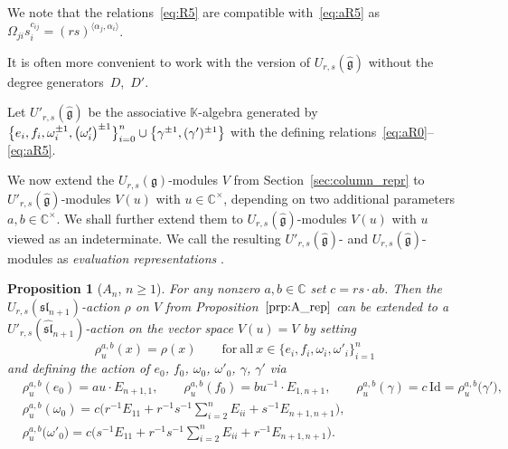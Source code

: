 \documentclass[10pt,a4paper]{amsart}
\numberwithin{equation}{section}
\newtheorem{Proposition}[Theorem]{Proposition}
 { \theoremstyle{definition}
\newtheorem{Definition}[Theorem]{Definition}
\newtheorem{Note}[Theorem]{Note}
\newtheorem{Example}[Theorem]{Example}
\newtheorem{Remark}[Theorem]{Remark} }
\newcommand{\fg}{\mathfrak{g}}
\newcommand{\BC}{\mathbb{C}}
\newcommand{\ssl}{\mathfrak{sl}}
\newcommand{\uu}{U_{r,s}(\fg)}
\newcommand{\UU}{U_{r,s}(\widehat{\fg})}
\newcommand{\Uu}{U'_{r,s}(\widehat{\fg})}
\newcommand{\Id}{\mathrm{Id}}
\begin{document}
 \begin{Remark}
We note that the relations~\eqref{eq:R5} are compatible with~\eqref{eq:aR5} as $\Omega_{ji}s_i^{c_{ij}}=(rs)^{\langle \alpha_j,\alpha_i\rangle}$.
\end{Remark}

It is often more convenient to work with the version of $\UU$ without the degree generators~$D$,~$D'$.

\begin{Definition}%
Let $\Uu$ be the associative $\mathbb{K}$-algebra generated by
$\smash{\bigl\{e_{i},f_{i},\omega_{i}^{\pm 1},\bigl(\omega_{i}'\bigr)^{\pm 1}\bigr\}_{i=0}^{n}}\cup \smash{\bigl\{\gamma^{\pm 1},(\gamma')^{\pm 1}\bigr\}}$
with the defining relations~\eqref{eq:aR0}--\eqref{eq:aR5}.
\end{Definition}

We now extend the $\uu$-modules $V$ from Section~\ref{sec:column_repr} to $\Uu$-modules $V(u)$ with $u\in\BC^\times$, depending on two additional parameters $a,b\in \BC^\times$. We shall further extend them to $\UU$-modules $V(u)$ with $u$ viewed as an indeterminate. We call the resulting $\Uu$- and $\UU$-modules as \emph{evaluation representations} .


\begin{Proposition}[$A_n$, $n\geq 1$]\label{prop:A_aff_rep}
For any nonzero $a,b\in \BC$ set $c=rs\cdot ab$. Then the $U_{r,s}(\ssl_{n+1})$-action $\rho$ on $V$ from Proposition~$\ref{prp:A_rep}$ can be extended to a $U'_{r,s}(\widehat{\ssl}_{n+1})$-action  on the vector space $V(u)=V$ by setting
\begin{displaymath}
 \rho^{a,b}_u(x)=\rho(x) \qquad \mathrm{for\ all} \ x\in \bigl\{e_i,f_i,\omega_i,\omega'_i\bigr\}_{i=1}^{n}
\end{displaymath}
and defining the action of $e_0$, $f_0$, $\omega_0$, $\omega'_0$, $\gamma$, $\gamma'$ via
\begin{displaymath}
\begin{split}
 & \rho^{a,b}_u(e_0)=au\cdot E_{n+1,1}, \qquad \rho^{a,b}_u(f_0)=bu^{-1}\cdot E_{1,n+1},
 \qquad \rho^{a,b}_u(\gamma)=c \, \Id=\rho^{a,b}_u\bigl(\gamma'\bigr), \\
 & \rho^{a,b}_u(\omega_0)=c\Biggl( r^{-1}E_{11}+r^{-1}s^{-1}\sum_{i=2}^{n}E_{ii}+s^{-1}E_{n+1,n+1} \Biggr), \\
 & \rho^{a,b}_u\bigl(\omega'_0\bigr)=c\Biggl( s^{-1}E_{11}+r^{-1}s^{-1}\sum_{i=2}^{n}E_{ii}+r^{-1}E_{n+1,n+1} \Biggr).
\end{split}
\end{displaymath}
\end{Proposition}
\end{document}
